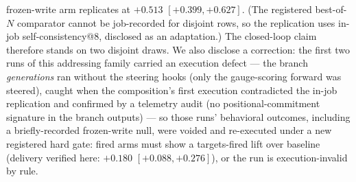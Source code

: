 \documentclass{article} %
\begin{document}
frozen-write arm replicates at $+0.513$ $[+0.399, +0.627]$. (The
registered best-of-$N$ comparator cannot be job-recorded for disjoint
rows, so the replication uses in-job self-consistency@8, disclosed as
an adaptation.) The closed-loop claim therefore stands on two
disjoint draws. We also disclose a correction: the first two runs
of this addressing family carried an execution defect --- the branch
\emph{generations} ran without the steering hooks (only the
gauge-scoring forward was steered), caught when the composition's
first execution contradicted the in-job replication and confirmed by
a telemetry audit (no positional-commitment signature in the branch
outputs) --- so those runs' behavioral outcomes, including a
briefly-recorded frozen-write null, were voided and re-executed under
a new registered hard gate: fired arms must show a targets-fired lift
over baseline (delivery verified here: $+0.180$ $[+0.088, +0.276]$),
or the run is execution-invalid by rule.
\end{document}
